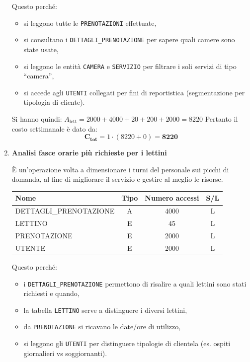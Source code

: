 \documentclass[a4paper,12pt]{report}
\begin{document}
\begin{enumerate}
	      Questo perché:
	      \begin{itemize}
		      \item si leggono tutte le \texttt{PRENOTAZIONI} effettuate,
		      \item si consultano i \texttt{DETTAGLI\_PRENOTAZIONE} per sapere quali camere sono state usate,
		      \item si leggono le entità \texttt{CAMERA} e \texttt{SERVIZIO} per filtrare i soli servizi di tipo “camera”,
		      \item si accede agli \texttt{UTENTI} collegati per fini di reportistica (segmentazione per tipologia di cliente).
	      \end{itemize}

	      Si hanno quindi: $A_{\text{lett}} = 2000 + 4000 + 20 + 200 + 2000 = 8220$
	      Pertanto il costo settimanale è dato da:
	      $$
		      \mathbf{C_{tot}} = 1 \cdot (8220 + 0) = \mathbf{8220}
	      $$


	\item {\large \textbf{Analisi fasce orarie più richieste per i lettini}} \label{op20}

	      È un'operazione volta a dimensionare i turni del personale sui picchi di domanda, al fine di migliorare il servizio e gestire al meglio le risorse.

	      \begin{table}[H]
		      \centering
		      \small
		      \renewcommand{\arraystretch}{1.15}
		      \begin{tabularx}{0.8\textwidth}{|X|c|c|c|}
			      \hline
			      \rowcolor{gray!20}
			      \textbf{Nome}          & \textbf{Tipo} & \textbf{Numero accessi} & \textbf{S/L} \\
			      \hline
			      DETTAGLI\_PRENOTAZIONE & A             & 4000                    & L            \\
			      LETTINO                & E             & 45                      & L            \\
			      PRENOTAZIONE           & E             & 2000                    & L            \\
			      UTENTE                 & E             & 2000                    & L            \\
			      \hline
		      \end{tabularx}
	      \end{table}

	      Questo perché:
	      \begin{itemize}
		      \item i \texttt{DETTAGLI\_PRENOTAZIONE} permettono di risalire a quali lettini sono stati richiesti e quando,
		      \item la tabella \texttt{LETTINO} serve a distinguere i diversi lettini,
		      \item da \texttt{PRENOTAZIONE} si ricavano le date/ore di utilizzo,
		      \item si leggono gli \texttt{UTENTI} per distinguere tipologie di clientela (es. ospiti giornalieri vs soggiornanti).
	      \end{itemize}


\end{enumerate}
\end{document}
